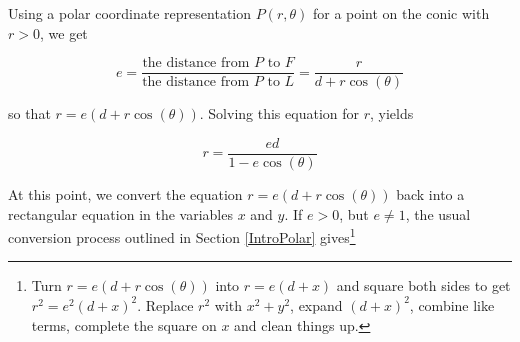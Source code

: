 Using a polar coordinate representation $P(r,\theta)$ for a point on the conic with $r > 0$, we get

\[ e =  \dfrac{\text{the distance from $P$ to $F$}}{\text{the distance from $P$ to $L$}} = \dfrac{r}{d+r\cos(\theta)} \]

so that $r = e(d+r\cos(\theta))$.  Solving this equation for $r$, yields 

\vspace{-.1in}

\[ r = \dfrac{ed}{1-e\cos(\theta)}\]

At this point, we convert the equation $r = e(d+r\cos(\theta))$ back into a rectangular equation in the variables $x$ and $y$.  If $e > 0$, but $e\neq 1$, the usual conversion process outlined in Section \ref{IntroPolar} gives\footnote{Turn $r = e(d+r\cos(\theta))$ into $r = e(d + x)$ and square both sides to get $r^{2} = e^{2}(d + x)^{2}$.  Replace $r^{2}$ with $x^{2} + y^{2}$, expand $(d + x)^{2}$, combine like terms, complete the square on $x$ and clean things up.}

